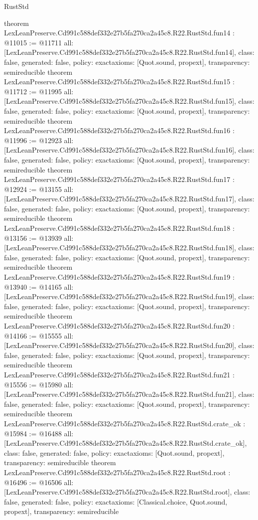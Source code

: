 \begin{lexlean}{RustStd}
\begin{coremodule}
{}
theorem LexLeanPreserve.Cd991c588def332e27b5fa270ca2a45c8.R22.RustStd.fun14 : @11015 := @11711 {
  all: [LexLeanPreserve.Cd991c588def332e27b5fa270ca2a45c8.R22.RustStd.fun14],
  class: false,
  generated: false,
  policy: exact{axioms: [Quot.sound, propext]},
  transparency: semireducible
}
theorem LexLeanPreserve.Cd991c588def332e27b5fa270ca2a45c8.R22.RustStd.fun15 : @11712 := @11995 {
  all: [LexLeanPreserve.Cd991c588def332e27b5fa270ca2a45c8.R22.RustStd.fun15],
  class: false,
  generated: false,
  policy: exact{axioms: [Quot.sound, propext]},
  transparency: semireducible
}
theorem LexLeanPreserve.Cd991c588def332e27b5fa270ca2a45c8.R22.RustStd.fun16 : @11996 := @12923 {
  all: [LexLeanPreserve.Cd991c588def332e27b5fa270ca2a45c8.R22.RustStd.fun16],
  class: false,
  generated: false,
  policy: exact{axioms: [Quot.sound, propext]},
  transparency: semireducible
}
theorem LexLeanPreserve.Cd991c588def332e27b5fa270ca2a45c8.R22.RustStd.fun17 : @12924 := @13155 {
  all: [LexLeanPreserve.Cd991c588def332e27b5fa270ca2a45c8.R22.RustStd.fun17],
  class: false,
  generated: false,
  policy: exact{axioms: [Quot.sound, propext]},
  transparency: semireducible
}
theorem LexLeanPreserve.Cd991c588def332e27b5fa270ca2a45c8.R22.RustStd.fun18 : @13156 := @13939 {
  all: [LexLeanPreserve.Cd991c588def332e27b5fa270ca2a45c8.R22.RustStd.fun18],
  class: false,
  generated: false,
  policy: exact{axioms: [Quot.sound, propext]},
  transparency: semireducible
}
theorem LexLeanPreserve.Cd991c588def332e27b5fa270ca2a45c8.R22.RustStd.fun19 : @13940 := @14165 {
  all: [LexLeanPreserve.Cd991c588def332e27b5fa270ca2a45c8.R22.RustStd.fun19],
  class: false,
  generated: false,
  policy: exact{axioms: [Quot.sound, propext]},
  transparency: semireducible
}
theorem LexLeanPreserve.Cd991c588def332e27b5fa270ca2a45c8.R22.RustStd.fun20 : @14166 := @15555 {
  all: [LexLeanPreserve.Cd991c588def332e27b5fa270ca2a45c8.R22.RustStd.fun20],
  class: false,
  generated: false,
  policy: exact{axioms: [Quot.sound, propext]},
  transparency: semireducible
}
theorem LexLeanPreserve.Cd991c588def332e27b5fa270ca2a45c8.R22.RustStd.fun21 : @15556 := @15980 {
  all: [LexLeanPreserve.Cd991c588def332e27b5fa270ca2a45c8.R22.RustStd.fun21],
  class: false,
  generated: false,
  policy: exact{axioms: [Quot.sound, propext]},
  transparency: semireducible
}
theorem LexLeanPreserve.Cd991c588def332e27b5fa270ca2a45c8.R22.RustStd.crate_ok : @15984 := @16488 {
  all: [LexLeanPreserve.Cd991c588def332e27b5fa270ca2a45c8.R22.RustStd.crate_ok],
  class: false,
  generated: false,
  policy: exact{axioms: [Quot.sound, propext]},
  transparency: semireducible
}
theorem LexLeanPreserve.Cd991c588def332e27b5fa270ca2a45c8.R22.RustStd.root : @16496 := @16506 {
  all: [LexLeanPreserve.Cd991c588def332e27b5fa270ca2a45c8.R22.RustStd.root],
  class: false,
  generated: false,
  policy: exact{axioms: [Classical.choice, Quot.sound, propext]},
  transparency: semireducible
}


\end{coremodule}
\end{lexlean}
